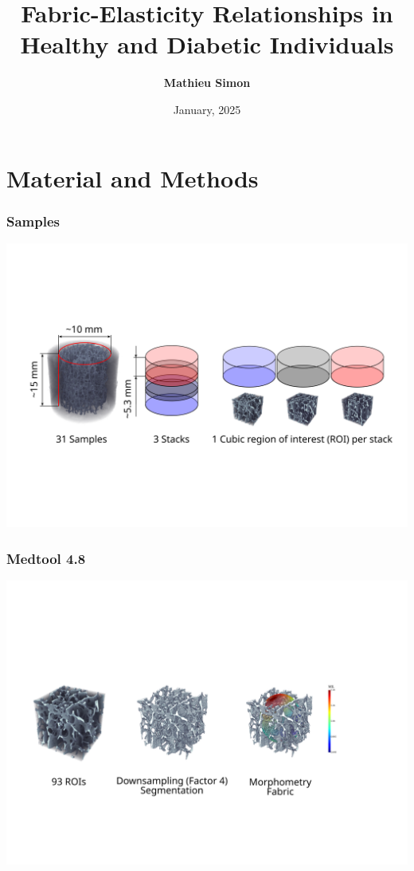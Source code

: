 \documentclass[xcolor=table,11pt]{beamer}
\title[DIAFAB]{Fabric-Elasticity Relationships in Healthy and Diabetic Individuals}
\author[mathieu.simon@unibe.ch]{\tiny{\bf{Mathieu Simon}}}
\date{January, 2025}
\begin{document}
	
	\begin{frame}
		\titlepage
	\end{frame}
	
	
	\section{Material and Methods}

	\begin{frame}
		\frametitle{Samples}
		\includegraphics[width=\linewidth]{Pictures/Material}\\
	\end{frame}

	\begin{frame}
		\frametitle{Medtool 4.8}
		\includegraphics[width=\linewidth]{Pictures/Medtool}\\
	\end{frame}
\end{document}
